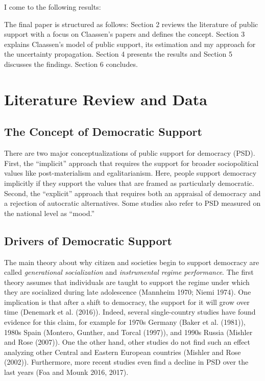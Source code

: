 \documentclass[12pt,english,a4paper,oneside]{article}
\theoremstyle{definition}
\theoremstyle{definition}
\theoremstyle{definition}
\theoremstyle{definition}
\theoremstyle{remark}
\begin{document}
I come to the following results:

The final paper is structured as follows: Section 2 reviews the literature of public support with a focus on Claassen's papers and defines the concept. Section 3 explains Claassen's model of public support, its estimation and my approach for the uncertainty propagation. Section 4 presents the results and Section 5 discusses the findings. Section 6 concludes.

\hypertarget{literature-review-and-data}{%
\section{Literature Review and Data}\label{literature-review-and-data}}

\hypertarget{the-concept-of-democratic-support}{%
\subsection{The Concept of Democratic Support}\label{the-concept-of-democratic-support}}

There are two major conceptualizations of public support for democracy (PSD). First, the \enquote{implicit} approach that requires the support for broader sociopolitical values like post-materialism and egalitarianism. Here, people support democracy implicitly if they support the values that are framed as particularly democratic. Second, the \enquote{explicit} approach that requires both an appraisal of democracy and a rejection of autocratic alternatives. Some studies also refer to PSD measured on the national level as \enquote{mood.}

\hypertarget{drivers-of-democratic-support}{%
\subsection{Drivers of Democratic Support}\label{drivers-of-democratic-support}}

The main theory about why citizen and societies begin to support democracy are called \emph{generational socialization} and \emph{instrumental regime performance}. The first theory assumes that individuals are taught to support the regime under which they are socialized during late adolescence (Mannheim 1970; Niemi 1974). One implication is that after a shift to democracy, the support for it will grow over time (Denemark et al. (2016)). Indeed, several single-country studies have found evidence for this claim, for example for 1970s Germany (Baker et al. (1981)), 1980s Spain (Montero, Gunther, and Torcal (1997)), and 1990s Russia (Mishler and Rose (2007)). One the other hand, other studies do not find such an effect analyzing other Central and Eastern European countries (Mishler and Rose (2002)). Furthermore, more recent studies even find a decline in PSD over the last years (Foa and Mounk 2016, 2017).
\end{document}

